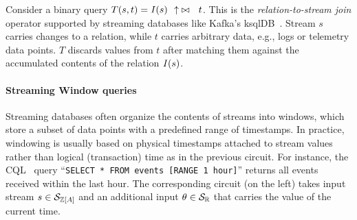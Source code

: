 Consider a binary query $T(s, t) = \mathit{I}(s)~~{\uparrow}\bowtie~~t$.  This is the
\emph{relation-to-stream join} operator supported by streaming databases like Kafka's ksqlDB~\cite{jafarpour-edbt19}.
Stream $s$ carries changes to a relation, while $t$ carries arbitrary data, e.g., logs
or telemetry data points. $T$ discards values from $t$ after matching them against the accumulated contents of the relation $\mathit{I}(s)$.


\paragraph{Streaming Window queries}

Streaming databases often organize the contents of streams into windows,
which store a subset of data points with a predefined range of timestamps.
In practice, windowing is usually based on physical timestamps attached to
stream values rather than logical (transaction) time as in the previous circuit.
For instance, the CQL~\cite{arasu-tr02} query
``\texttt{SELECT * FROM events [RANGE 1 hour]}'' returns all events received
within the last hour.  The corresponding circuit (on the left)
takes input stream $s \in \mathcal{S}_{\mathbb{Z}[A]}$ and an additional
input $\theta \in \mathcal{S}_{\mathbb{R}}$ that carries the value of the current
time.

